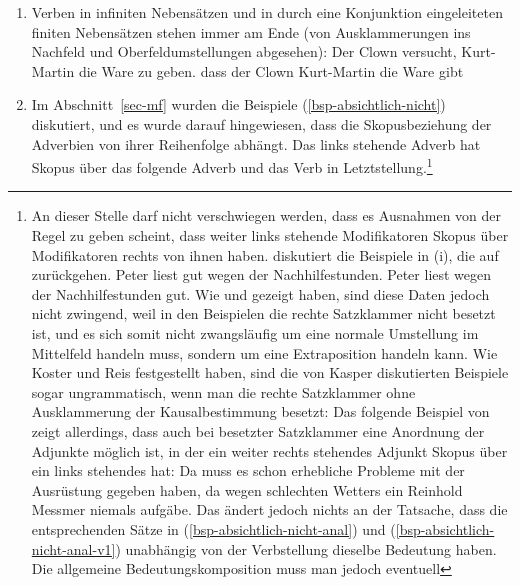 \begin{enumerate}
\item Verben in infiniten Nebensätzen und in durch eine Konjunktion eingeleiteten
finiten Nebensätzen stehen immer am Ende (von Ausklammerungen ins Nachfeld und Oberfeldumstellungen abgesehen):
\eal
\ex Der Clown versucht, Kurt-Martin die Ware zu geben.
\ex dass der Clown Kurt-Martin die Ware gibt
\zl
\item{} Im Abschnitt~\ref{sec-mf} wurden die Beispiele (\ref{bsp-absichtlich-nicht}) diskutiert,
und es wurde darauf hingewiesen, dass die Skopusbeziehung der Adverbien
von ihrer Reihenfolge abhängt. Das links stehende Adverb hat Skopus über das folgende Adverb
und das Verb in Letztstellung.\setlength{\footexindent}{13.5pt}\footnote{%
An dieser Stelle darf nicht verschwiegen werden,
  dass es Ausnahmen von der Regel zu geben scheint, dass weiter links stehende Modifikatoren
  Skopus über Modifikatoren rechts von ihnen haben. \citet*[]{Kasper94a}
  diskutiert die Beispiele in (i), die auf  \citet*[]{BV72} zurückgehen.
\eal
\label{bsp-peter-liest-gut-wegen}
\ex Peter liest gut wegen der Nachhilfestunden.
\ex Peter liest wegen der Nachhilfestunden gut.
\zl
  Wie \citet[Abschnitt~6]{Koster75a} und \citet*[]{Reis80a} gezeigt haben, sind diese Daten jedoch nicht
  zwingend, weil in den Beispielen die rechte Satzklammer nicht besetzt ist, und es sich
  somit nicht zwangsläufig um eine normale Umstellung im Mittelfeld handeln muss, sondern um 
  eine Extraposition handeln kann. Wie Koster und Reis festgestellt haben,
  sind die von Kasper diskutierten Beispiele sogar ungrammatisch,
  wenn man die rechte Satzklammer ohne Ausklammerung der Kausalbestimmung besetzt:
\eal
{}
\zl
  Das folgende Beispiel von \citet[]{Crysmann2004a}
  zeigt allerdings, dass auch bei besetzter Satzklammer eine Anordnung der Adjunkte
  möglich ist, in der ein weiter rechts stehendes Adjunkt Skopus über ein links stehendes hat:
\eanoraggedright
Da muss es schon erhebliche Probleme mit der Ausrüstung gegeben haben, da wegen schlechten
  Wetters ein Reinhold Messmer niemals aufgäbe.
\z
Das ändert jedoch nichts an der Tatsache, dass die entsprechenden
Sätze in (\ref{bsp-absichtlich-nicht-anal}) und (\ref{bsp-absichtlich-nicht-anal-v1}) unabhängig von der Verbstellung
dieselbe Bedeutung haben. Die allgemeine Bedeutungskomposition muss man jedoch eventuell
}
\end{enumerate}
